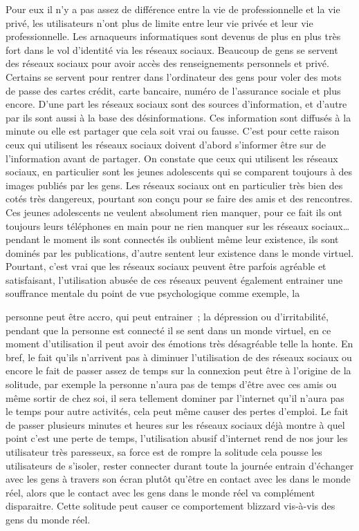 \documentclass[12pt,a4paper,titlepage]{article}
\begin{document}
Pour eux il n’y a pas assez de différence entre la vie de
professionnelle et la vie privé, les utilisateurs n’ont plus de
limite entre leur vie privée et leur vie professionnelle.
Les arnaqueurs informatiques sont devenus de plus en plus
très fort dans le vol d’identité via les réseaux sociaux.
Beaucoup de gens se servent des réseaux sociaux pour avoir
accès des renseignements personnels et privé.
Certains se servent pour rentrer dans l’ordinateur des gens
pour voler des mots de passe des cartes crédit, carte
bancaire, numéro de l’assurance sociale et plus encore.
D’une part les réseaux sociaux sont des sources
d’information, et d’autre par ils sont aussi à la base des
désinformations. Ces information sont diffusés à la minute ou
elle est partager que cela soit vrai ou fausse. C’est pour cette
raison ceux qui utilisent les réseaux sociaux doivent d’abord
s’informer être sur de l’information avant de partager.
On constate que ceux qui utilisent les réseaux sociaux, en
particulier sont les jeunes adolescents qui se comparent
toujours à des images publiés par les gens. Les réseaux
sociaux ont en particulier très bien des cotés très dangereux,
pourtant son conçu pour se faire des amis et des rencontres.
Ces jeunes adolescents ne veulent absolument rien manquer,
pour ce fait ils ont toujours leurs téléphones en main pour ne
rien manquer sur les réseaux sociaux… pendant le moment ils
sont connectés ils oublient même leur existence, ils sont
dominés par les publications, d’autre sentent leur existence
dans le monde virtuel.
Pourtant, c’est vrai que les réseaux sociaux peuvent être
parfois agréable et satisfaisant, l’utilisation abusée de ces
réseaux peuvent également entrainer une souffrance
mentale du point de vue psychologique comme exemple, la

personne peut être accro, qui peut entrainer ; la dépression
ou d’irritabilité, pendant que la personne est connecté il se
sent dans un monde virtuel, en ce moment d’utilisation il
peut avoir des émotions très désagréable telle la honte.
En bref, le fait qu’ils n’arrivent pas à diminuer l’utilisation de
des réseaux sociaux ou encore le fait de passer assez de
temps sur la connexion peut être à l’origine de la solitude, par
exemple la personne n’aura pas de temps d’être avec ces
amis ou même sortir de chez soi, il sera tellement dominer
par l’internet qu’il n’aura pas le temps pour autre activités,
cela peut même causer des pertes d’emploi.
Le fait de passer plusieurs minutes et heures sur les réseaux
sociaux déjà montre à quel point c’est une perte de temps,
l’utilisation abusif d’internet rend de nos jour les utilisateur
très paresseux, sa force est de rompre la solitude cela pousse
les utilisateurs de s’isoler, rester connecter durant toute la
journée entrain d’échanger avec les gens à travers son écran
plutôt qu’être en contact avec les dans le monde réel, alors
que le contact avec les gens dans le monde réel va
complément disparaitre. Cette solitude peut causer ce
comportement blizzard vis-à-vis des gens du monde réel.
\end{document}
